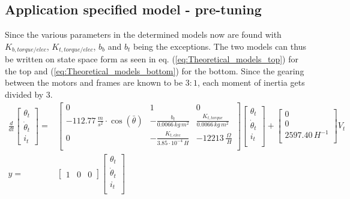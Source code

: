 \documentclass[../../main]{subfiles}
\begin{document}
\subsection{Application specified model - pre-tuning}
Since the various parameters in the determined models now are found with $K_{b,torque/elec}$, $K_{t,torque/elec}$, $b_b$ and $b_t$ being the exceptions. The two models can thus be written on state space form as seen in eq. (\ref{eq:Theoretical_models_top}) for the top and (\ref{eq:Theoretical_models_bottom}) for the bottom. Since the gearing between the motors and frames are known to be $3:1$, each moment of inertia gets divided by $3$.
\begin{equation}
      \label{eq:Theoretical_models_top}
      \begin{split}
      \frac{d}{dt}
          \begin{bmatrix}
              \theta_t \\
              \dot \theta_t \\
              i_t
          \end{bmatrix}
              =&
          \begin{bmatrix}
              0                                                   & 1                         & 0                             \\
              -112.77 \, \si{\frac{m}{s^2}} \cdot \cos(\bar \theta) & -\frac{b_t}{0.0066 \si{\,kg\,m^2} }  & \frac{K_{t,torque}}{0.0066 \si{\,kg\,m^2}} \\
              0    & -\frac{K_{t,elec}}{3.85\cdot 10^{-4}\si{\,H}}  & -12213 \si{\, \frac{\Omega}{\,H}}              \\
          \end{bmatrix}
          \begin{bmatrix}
              \theta_t      \\
              \dot \theta_t \\
              i_t           \\
          \end{bmatrix}
              +
          \begin{bmatrix}
              0             \\
              0             \\
              2597.40 \si{\,H^{-1}} \\
          \end{bmatrix}
              V_t
\\
          y =&
          \begin{bmatrix}
              1 & 0 & 0
          \end{bmatrix}
          \begin{bmatrix}
              \theta_t      \\
              \dot \theta_t \\
              i_t           \\
          \end{bmatrix}
    \end{split}
\end{equation}
\end{document}

